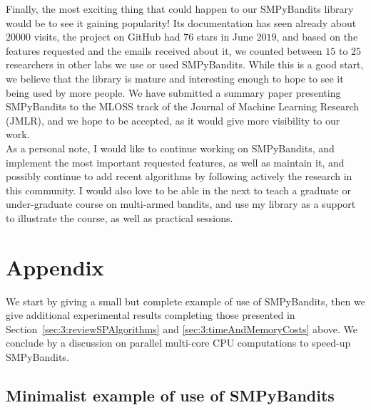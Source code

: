 Finally, the most exciting thing that could happen to our SMPyBandits library would be to see it gaining popularity!
Its documentation has seen already about $20000$ visits, the project on GitHub had $76$ stars in June $2019$, and based on the features requested and the emails received about it, we counted between $15$ to $25$ researchers in other labs we use or used SMPyBandits.
While this is a good start, we believe that the library is mature and interesting enough to hope to see it being used by more people.
%
We have submitted a summary paper presenting SMPyBandits \cite{SMPyBanditsJMLR} to the MLOSS track of the Journal of Machine Learning Research (JMLR), and we hope to be accepted, as it would give more visibility to our work.\\
%
\indent
As a personal note, I would like to continue working on SMPyBandits, and implement the most important requested features, as well as maintain it, and possibly continue to add recent algorithms by following actively the research in this community.
I would also love to be able in the next to teach a graduate or under-graduate course on multi-armed bandits, and use my library as a support to illustrate the course, as well as practical sessions.


\newpage  %
\section{Appendix}
\label{sec:3:appendix}

We start by giving a small but complete example of use of SMPyBandits, then we give additional experimental results completing those presented in Section~\ref{sec:3:reviewSPAlgorithms} and \ref{sec:3:timeAndMemoryCosts} above.
We conclude by a discussion on parallel multi-core CPU computations to speed-up SMPyBandits.


\subsection{Minimalist example of use of SMPyBandits}

